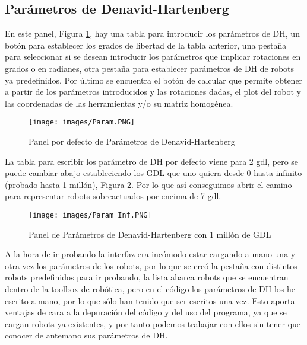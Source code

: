 \documentclass[a4paper, fontsize=11pt]{scrartcl} %
\numberwithin{equation}{section} %
\numberwithin{figure}{section} %
\numberwithin{table}{section} %
\begin{document}
	\subsection{Parámetros de Denavid-Hartenberg}
	
	En este panel, Figura \ref{Parametros}, hay una tabla para introducir los parámetros de DH, un botón para establecer los grados de libertad de la tabla anterior, una pestaña para seleccionar si se desean introducir los parámetros que implicar rotaciones en grados o en radianes, otra pestaña para establecer parámetros de DH de robots ya predefinidos. Por último se encuentra el botón de calcular que permite obtener a partir de los parámetros introducidos y las rotaciones dadas, el plot del robot y las coordenadas de las herramientas y/o su matriz homogénea.\\
	
	\begin{figure}[h!]
		\centering
		\texttt{[image: images/Param.PNG]}
		\caption{Panel por defecto de Parámetros de Denavid-Hartenberg}
		\label{Parametros}
	\end{figure}
	\FloatBarrier
	
	La tabla para escribir los parámetro de DH por defecto viene para 2 gdl, pero se puede cambiar abajo estableciendo los GDL que uno quiera desde 0 hasta infinito (probado hasta 1 millón), Figura \ref{Parametros_Inf}. Por lo que así conseguimos abrir el camino para representar robots sobreactuados por encima de 7 gdl.\\
	
	\begin{figure}[h!]
		\centering
		\texttt{[image: images/Param\_Inf.PNG]}
		\caption{Panel de Parámetros de Denavid-Hartenberg con 1 millón de GDL}
		\label{Parametros_Inf}
	\end{figure}
	\FloatBarrier
	
	A la hora de ir probando la interfaz era incómodo estar cargando a mano una y otra vez los parámetros de los robots, por lo que se creó la pestaña con distintos robots predefinidos para ir probando, la lista abarca robots que se encuentran dentro de la toolbox de robótica, pero en el código los parámetros de DH los he escrito a mano, por lo que sólo han tenido que ser escritos una vez. Esto aporta ventajas de cara a la depuración del código y del uso del programa, ya que se cargan robots ya existentes, y por tanto podemos trabajar con ellos sin tener que conocer de antemano sus parámetros de DH.\\
	
\end{document}
